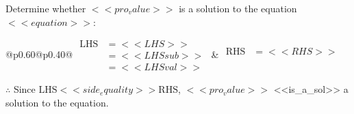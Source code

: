 \noindent{(\theminipagecount)}\hspace{0.1mm} %
\begin{minipage}[t]{0.40\textwidth} %

    \noindent Determine whether \(<<pro_value>>\) is a solution to the equation \(<<equation>>\):
    \vspace{2pt}  %

    \noindent
    \renewcommand{\arraystretch}{1.3} %
    \begin{tabular}{@{}p{0.60\linewidth}@{}p{0.40\linewidth}@{}}
        \(\begin{aligned}
            \text{LHS} &= <<LHS>> \\
                    &= <<LHSsub>> \\
                    &= <<LHSval>>
        \end{aligned}\) &
        \(\begin{aligned}
            \text{RHS} &= <<RHS>>\\
                    & \\
                    &
        \end{aligned}\)
    \end{tabular}
    \renewcommand{\arraystretch}{1.0} %
    \vspace{2pt}  %

    \noindent \(\therefore\) Since \(\text{LHS} <<side_equality>> \text{RHS}\), \(<<pro_value>>\) <<is_a_sol>> a solution to the equation.

\end{minipage}

\vspace*{0.5ex}
\vfill{}
